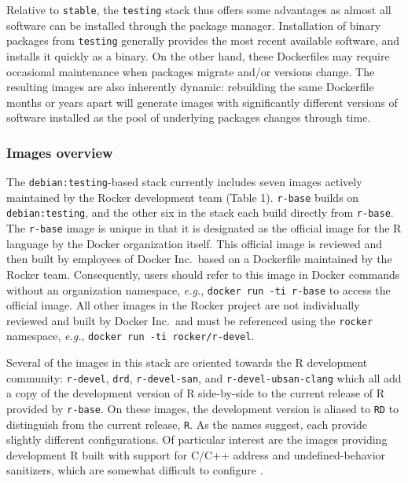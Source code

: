 Relative to \texttt{stable}, the \texttt{testing} stack thus offers some
advantages as almost all software can be installed through the package
manager. Installation of binary packages from \texttt{testing} generally
provides the most recent available software, and installs it quickly as
a binary. On the other hand, these Dockerfiles may require occasional
maintenance when packages migrate and/or versions change. The resulting
images are also inherently dynamic: rebuilding the same Dockerfile
months or years apart will generate images with significantly different
versions of software installed as the pool of underlying packages
changes through time.

\subsubsection{Images overview}\label{images-overview}

The \texttt{debian:testing}-based stack currently includes seven images
actively maintained by the Rocker development team (Table 1).
\texttt{r-base} builds on \texttt{debian:testing}, and the other six in
the stack each build directly from \texttt{r-base}. The \texttt{r-base}
image is unique in that it is designated as the official image for the R
language by the Docker organization itself. This official image is
reviewed and then built by employees of Docker Inc.~based on a
Dockerfile maintained by the Rocker team. Consequently, users should
refer to this image in Docker commands without an organization
namespace, \emph{e.g.}, \texttt{docker\ run\ -ti\ r-base} to access the
official image. All other images in the Rocker project are not
individually reviewed and built by Docker Inc.~and must be referenced
using the \texttt{rocker} namespace, \emph{e.g.},
\texttt{docker\ run\ -ti\ rocker/r-devel}.

Several of the images in this stack are oriented towards the R
development community: \texttt{r-devel}, \texttt{drd},
\texttt{r-devel-san}, and \texttt{r-devel-ubsan-clang} which all add a
copy of the development version of R side-by-side to the current release
of R provided by \texttt{r-base}. On these images, the development
version is aliased to \texttt{RD} to distinguish from the current
release, \texttt{R}. As the names suggest, each provide slightly
different configurations. Of particular interest are the images
providing development R built with support for C/C++ address and
undefined-behavior sanitizers, which are somewhat difficult to configure
\citep{edd_sanitizers}.

